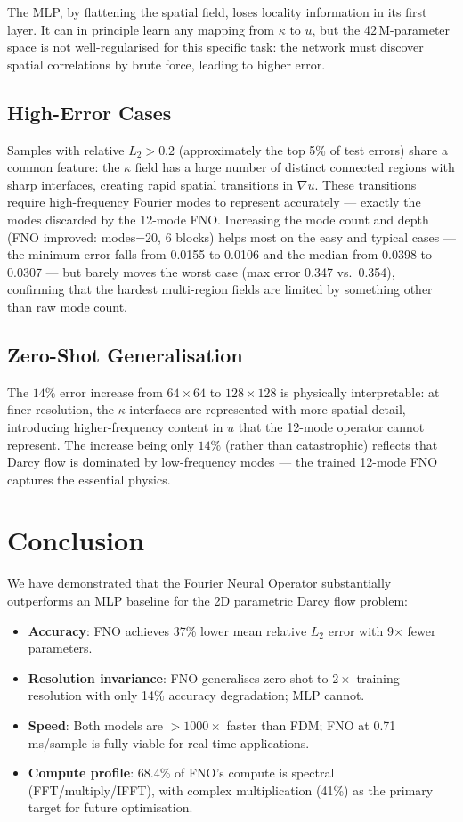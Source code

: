 \documentclass[11pt,a4paper]{article}
\begin{document}
The MLP, by flattening the spatial field, loses locality information in its first layer. It can in principle learn any mapping from $\kappa$ to $u$, but the 42\,M-parameter space is not well-regularised for this specific task: the network must discover spatial correlations by brute force, leading to higher error.

\subsection{High-Error Cases}
Samples with relative $L_2 > 0.2$ (approximately the top 5\% of test errors) share a common feature: the $\kappa$ field has a large number of distinct connected regions with sharp interfaces, creating rapid spatial transitions in $\nabla u$. These transitions require high-frequency Fourier modes to represent accurately --- exactly the modes discarded by the 12-mode FNO. Increasing the mode count and depth (FNO improved: modes=20, 6 blocks) helps most on the easy and typical cases --- the minimum error falls from 0.0155 to 0.0106 and the median from 0.0398 to 0.0307 --- but barely moves the worst case (max error 0.347 vs.\ 0.354), confirming that the hardest multi-region fields are limited by something other than raw mode count.

\subsection{Zero-Shot Generalisation}
The $14\%$ error increase from $64\times64$ to $128\times128$ is physically interpretable: at finer resolution, the $\kappa$ interfaces are represented with more spatial detail, introducing higher-frequency content in $u$ that the 12-mode operator cannot represent. The increase being only $14\%$ (rather than catastrophic) reflects that Darcy flow is dominated by low-frequency modes --- the trained 12-mode FNO captures the essential physics.

\section{Conclusion}

We have demonstrated that the Fourier Neural Operator substantially outperforms an MLP baseline for the 2D parametric Darcy flow problem:

\begin{itemize}[nosep]
  \item \textbf{Accuracy}: FNO achieves 37\% lower mean relative $L_2$ error with 9$\times$ fewer parameters.
  \item \textbf{Resolution invariance}: FNO generalises zero-shot to $2\times$ training resolution with only 14\% accuracy degradation; MLP cannot.
  \item \textbf{Speed}: Both models are $>1000\times$ faster than FDM; FNO at 0.71\,ms/sample is fully viable for real-time applications.
  \item \textbf{Compute profile}: 68.4\% of FNO's compute is spectral (FFT/multiply/IFFT), with complex multiplication (41\%) as the primary target for future optimisation.
\end{itemize}
\end{document}
